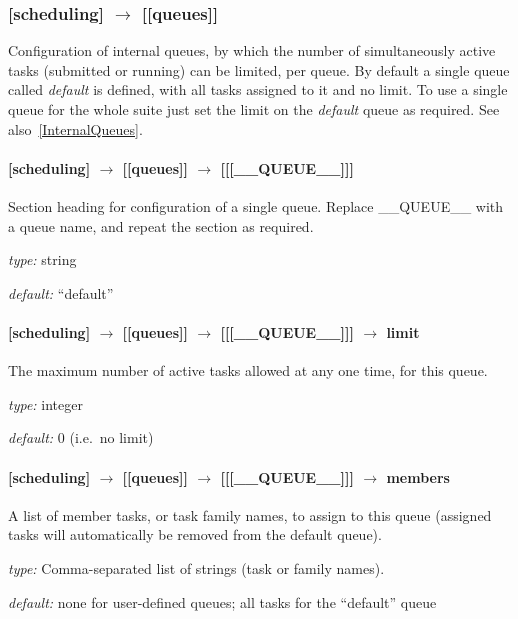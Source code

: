 \subsubsection[{[[}queues{]]}]{[scheduling] $\rightarrow$ [[queues]]}

Configuration of internal queues, by which the number of simultaneously
active tasks (submitted or running) can be limited, per queue. By
default a single queue called {\em default} is defined, with all tasks
assigned to it and no limit. To use a single queue for the whole suite
just set the limit on the {\em default} queue as required.
See also~\ref{InternalQueues}.

\paragraph[{[[[}\_\_QUEUE\_\_{]]]}]{[scheduling] $\rightarrow$ [[queues]] $\rightarrow$ [[[\_\_QUEUE\_\_]]]}

Section heading for configuration of a single queue. Replace
\_\_QUEUE\_\_ with a queue name, and repeat the section as required.

\begin{myitemize}
\item {\em type:} string
\item {\em default:} ``default''
\end{myitemize}

\paragraph[limit]{[scheduling] $\rightarrow$ [[queues]] $\rightarrow$ [[[\_\_QUEUE\_\_]]] $\rightarrow$ limit}

The maximum number of active tasks allowed at any one time, for this queue.
\begin{myitemize}
\item {\em type:} integer
\item {\em default:} 0 (i.e.\ no limit)
\end{myitemize}

\paragraph[members]{[scheduling] $\rightarrow$ [[queues]] $\rightarrow$ [[[\_\_QUEUE\_\_]]] $\rightarrow$ members}

A list of member tasks, or task family names, to assign to this queue
(assigned tasks will automatically be removed from the default queue).
\begin{myitemize}
\item {\em type:} Comma-separated list of strings (task or family names).
\item {\em default:} none for user-defined queues; all tasks for the ``default'' queue
\end{myitemize}

